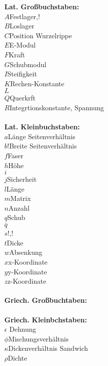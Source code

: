 \textbf{Lat. Großbuchstaben:}\\
$A$\quad\quad Festlager,!\\
$B$\quad\quad Loslager\\
$C$\quad\quad Position Wurzelrippe\\
$E$\quad\quad E-Modul\\
$F$\quad\quad Kraft\\
$G$\quad\quad Schubmodul\\
$I$\quad\quad Steifigkeit\\
$K$\quad\quad Rechen-Konstante\\
$L$\quad\quad \\
$Q$\quad\quad Querkrft\\
$R$\quad\quad Integrtionskonstante, Spannung\\
\\
\noindent\textbf{Lat. Kleinbuchstaben:}\\
$a$\quad\quad Länge Seitenverhältnis\\
$b$!\quad\quad Breite Seitenverhältnis\\
$f$\quad\quad Faser\\
$h$\quad\quad Höhe\\
$i$\quad\quad \\
$j$\quad\quad Sicherheit\\
$l$\quad\quad Länge\\
$m$\quad\quad Matrix\\
$n$\quad\quad Anzahl\\
$q$\quad\quad Schub\\
$\bar{q}$\quad\quad\\
$s$\quad\quad !,!\\
$t$\quad\quad Dicke\\
$w$\quad\quad Absenkung\\
$x$\quad\quad x-Koordinate\\
$y$\quad\quad y-Koordinate\\
$z$\quad\quad z-Koordinate\\
\\
\noindent\textbf{Griech. Großbuchtaben:}\\
\\
\noindent\textbf{Griech. Kleinbchstaben:}\\
$\epsilon$ \quad\quad Dehnung\\
$\phi$\quad\quad Mischungsverhältnis\\
$\kappa$\quad\quad Dickenverhältnis Sandwich\\
$\rho$\quad\quad Dichte\\
